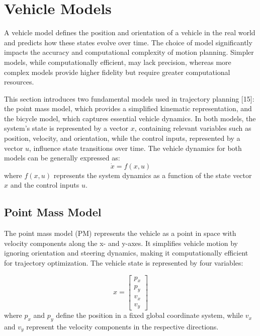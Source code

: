 \section{Vehicle Models} \label{sec:vehicle_models}

A vehicle model defines the position and orientation of a vehicle in the real world and predicts how these states evolve over time.
The choice of model significantly impacts the accuracy and computational complexity of motion planning.
Simpler models, while computationally efficient, may lack precision, whereas more complex models provide higher fidelity but require greater
computational resources.

This section introduces two fundamental models used in trajectory planning [15]: the point mass model, which provides a simplified kinematic
representation, and the bicycle model, which captures essential vehicle dynamics.
In both models, the system's state is represented by a vector $x$, containing relevant variables such as position, velocity, and orientation, while
the control inputs, represented by a vector $u$, influence state transitions over time.
The vehicle dynamics for both models can be generally expressed as:
\begin{equation}
	\dot{x} = f(x, u)
\end{equation}
where $f(x, u)$ represents the system dynamics as a function of the state vector $x$ and the
control inputs $u$.

\subsection{Point Mass Model} \label{subsec:point_mass_model}

The point mass model (PM) represents the vehicle as a point in space with velocity components along the x- and y-axes.
It simplifies vehicle motion by ignoring orientation and steering dynamics, making it computationally efficient for trajectory optimization.
The vehicle state is represented by four variables:

\begin{equation}
	x = \begin{bmatrix} p_x \\ p_y \\ v_x \\ v_y \end{bmatrix}
	\label{eq:states_pm}
\end{equation}
where $p_x$ and $p_y$ define the position in a fixed global coordinate system, while $v_x$ and $v_y$
represent the velocity components in the respective directions.

